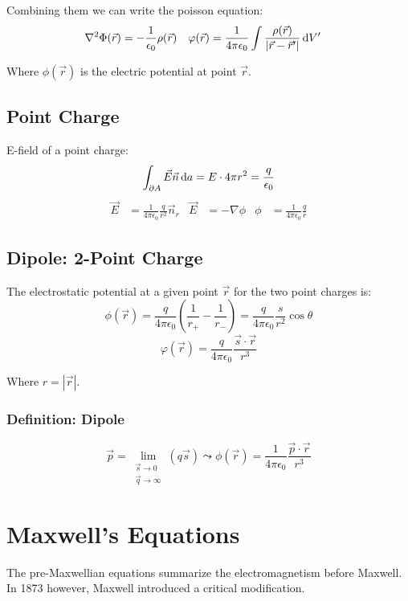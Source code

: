 \documentclass[a4paper, fontsize=8pt, landscape, DIV=1]{scrartcl}
\begin{document}
\begin{multicols*}{4}
  Combining them we can write the poisson equation:
  \begin{align*}
    \nabla^2\Phi(\vec{r}) &= -\frac{1}{\epsilon_0}\rho(\vec{r}) &
    \varphi(\vec{r}) &= \frac{1}{4\pi\epsilon_0}\int\frac{\rho(\vec{r})}{|\vec{r}-\vec{r}'|}\,\mathrm{d} V'
  \end{align*}

  Where $\phi(\vec{r})$ is the electric potential at point $\vec{r}$.

  \subsection{Point Charge}
  E-field of a point charge:
    \[\int_{\partial A} \vec{E}\vec{n} \,\mathrm{d} a = E\cdot4\pi r^2 = \frac{q}{\epsilon_0} \]
  \begin{align*}
    \vec{E} &= \frac{1}{4\pi\epsilon_0}\frac{q}{r^2}\vec{n}_r & \vec{E}&=-\nabla\phi & \phi&=\frac{1}{4\pi\epsilon_0}\frac{q}{r}
  \end{align*}

  \subsection{Dipole: 2-Point Charge}
  The electrostatic potential at a given point $\vec{r}$ for the two point charges is:
  \[\phi(\vec{r}) = \frac{q}{4\pi\epsilon_0}\left(\frac{1}{r_+}-\frac{1}{r_-}\right) =\frac{q}{4\pi\epsilon_0}\frac{s}{r^2}\cos\theta \]
  \[\varphi(\vec{r}) = \frac{q}{4\pi\epsilon_0}\frac{\vec{s}\cdot\vec{r}}{r^3} \]

  Where $r = |\vec{r}|$.

  \subsubsection{Definition: Dipole}
  \[\vec{p}=\lim_{\substack{\vec{s}\to 0 \\ \vec{q}\to \infty}}(q\vec{s}) \leadsto \phi(\vec{r})=\frac{1}{4\pi\epsilon_0}\frac{\vec{p}\cdot\vec{r}}{r^3}\]


  \section{Maxwell's Equations}
  The pre-Maxwellian equations summarize the electromagnetism before Maxwell. In 1873 however, Maxwell introduced a critical modification.


\end{multicols*}
\end{document}
